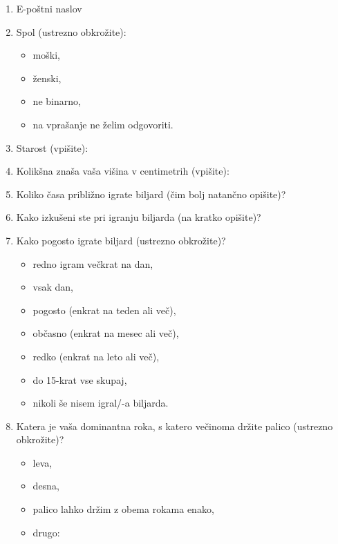 \documentclass[a4paper, 12pt]{book}
\begin{document}
\begin{enumerate}
    \item E-poštni naslov \dotfill

    \item Spol (ustrezno obkrožite):
    \begin{itemize}
        \item moški,
        \item ženski,
        \item ne binarno,
        \item na vprašanje ne želim odgovoriti.
    \end{itemize}

    \item Starost (vpišite): \dotfill

    \item Kolikšna znaša vaša višina v centimetrih (vpišite): \dotfill

    \item Koliko časa približno igrate biljard (čim bolj natančno opišite)?
    \dotfill

    \item Kako izkušeni ste pri igranju biljarda (na kratko opišite)?
    \dotfill

    \item Kako pogosto igrate biljard (ustrezno obkrožite)?
    \begin{itemize}
        \item redno igram večkrat na dan,
        \item vsak dan,
        \item pogosto (enkrat na teden ali več),
        \item občasno (enkrat na mesec ali več),
        \item redko (enkrat na leto ali več),
        \item do 15-krat vse skupaj,
        \item nikoli še nisem igral/-a biljarda.
    \end{itemize}

    \item Katera je vaša dominantna roka, s katero večinoma držite palico
    (ustrezno obkrožite)?
    \begin{itemize}
        \item leva,
        \item desna,
        \item palico lahko držim z obema rokama enako,
        \item drugo: \dotfill
    \end{itemize}


\end{enumerate}
\end{document}

